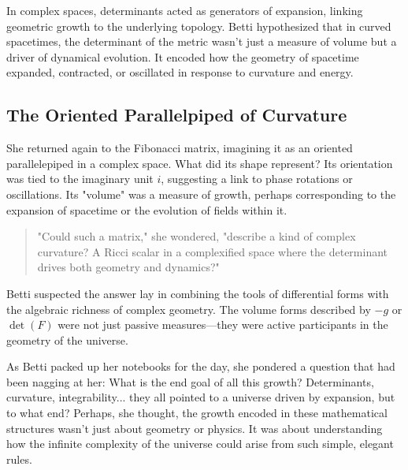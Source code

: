In complex spaces, determinants acted as generators of expansion, linking geometric growth to the underlying topology. Betti hypothesized that in curved spacetimes, the determinant of the metric wasn’t just a measure of volume but a driver of dynamical evolution. It encoded how the geometry of spacetime expanded, contracted, or oscillated in response to curvature and energy.

\subsection*{The Oriented Parallelpiped of Curvature}

She returned again to the Fibonacci matrix, imagining it as an oriented parallelepiped in a complex space. What did its shape represent? Its orientation was tied to the imaginary unit \(i\), suggesting a link to phase rotations or oscillations. Its "volume" was a measure of growth, perhaps corresponding to the expansion of spacetime or the evolution of fields within it.

\begin{quote}
"Could such a matrix," she wondered, "describe a kind of complex curvature? A Ricci scalar in a complexified space where the determinant drives both geometry and dynamics?"
\end{quote}

Betti suspected the answer lay in combining the tools of differential forms with the algebraic richness of complex geometry. The volume forms described by \(-g\) or \(\det(F)\) were not just passive measures—they were active participants in the geometry of the universe.

As Betti packed up her notebooks for the day, she pondered a question that had been nagging at her: What is the end goal of all this growth? Determinants, curvature, integrability... they all pointed to a universe driven by expansion, but to what end? Perhaps, she thought, the growth encoded in these mathematical structures wasn’t just about geometry or physics. It was about understanding how the infinite complexity of the universe could arise from such simple, elegant rules.


% 


% 

